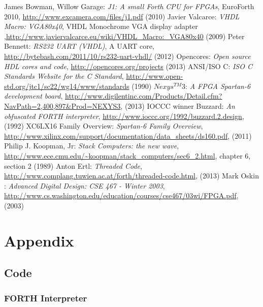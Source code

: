 \documentclass	[a4paper, 10pt]	{article}
\begin{document}
    \begin{thebibliography}{1}              %
     James Bowman, Willow Garage: \emph{J1: A small Forth CPU for FPGAs},  EuroForth 2010, \url{http://www.excamera.com/files/j1.pdf} (2010)
     Javier Valcarce: \emph{VHDL Macro: VGA80x40}, VHDL Monochrome VGA display adapter ,\url{http://www.javiervalcarce.eu/wiki/VHDL_Macro:_VGA80x40} (2009)
     Peter Bennett: \emph{RS232 UART (VHDL)}, A UART core, \url{http://bytebash.com/2011/10/rs232-uart-vhdl/} (2012)
     Opencores: \emph{Open source HDL cores and code}, \url{http://opencores.org/projects} (2013)
     ANSI/ISO C: \emph{ISO C Standards Website for the C Standard}, \url{http://www.open-std.org/jtc1/sc22/wg14/www/standards} (1990)
     $Nexys^{TM}$3: \emph{A FPGA Spartan-6 development board}, \url{http://www.digilentinc.com/Products/Detail.cfm?NavPath=2,400,897\&Prod=NEXYS3}, (2013)
     IOCCC winner Buzzard: \emph{An obfuscated FORTH interpreter}, \url{http://www.ioccc.org/1992/buzzard.2.design}, (1992)
     XC6LX16 Family Overview: \emph{Spartan-6 Family Overview}, \url{http://www.xilinx.com/support/documentation/data_sheets/ds160.pdf}, (2011)
     Philip J. Koopman, Jr: \emph{Stack Computers: the new wave}, \url{http://www.ece.cmu.edu/~koopman/stack_computers/sec6_2.html}, chapter 6, section 2 (1989)
     Anton Ertl: \emph{Threaded Code}, \url{http://www.complang.tuwien.ac.at/forth/threaded-code.html}, (2013)
     Mark Oskin : \emph{Advanced Digital Design: CSE 467 - Winter 2003}, \url{http://www.cs.washington.edu/education/courses/cse467/03wi/FPGA.pdf}, (2003)
    \end{thebibliography}



  \section{Appendix}

    \subsection{Code}
      \subsubsection{FORTH Interpreter}
\end{document}
